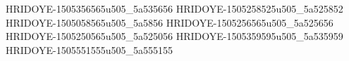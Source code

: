 HRIDOYE-1505356565u505_5a535656
HRIDOYE-1505258525u505_5a525852
HRIDOYE-1505058565u505_5a5856
HRIDOYE-1505256565u505_5a525656
HRIDOYE-1505250565u505_5a525056
HRIDOYE-1505359595u505_5a535959
HRIDOYE-1505551555u505_5a555155
